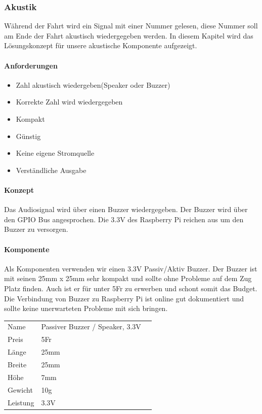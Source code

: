 \documentclass[../../main.tex]{subfiles}
\begin{document}
\subsubsection{Akustik}
Während der Fahrt wird ein Signal mit einer Nummer gelesen, diese Nummer soll am Ende der Fahrt akustisch wiedergegeben werden. In diesem Kapitel wird das Lösungskonzept für unsere akustische Komponente aufgezeigt.

\paragraph{Anforderungen}
\begin{itemize}
    \item Zahl akustisch wiedergeben(Speaker oder Buzzer)
    \item Korrekte Zahl wird wiedergegeben
    \item Kompakt
    \item Günstig
    \item Keine eigene Stromquelle
    \item Verständliche Ausgabe
\end{itemize}

\paragraph{Konzept}
Das Audiosignal wird über einen Buzzer wiedergegeben. Der Buzzer wird über den GPIO Bus angesprochen. Die 3.3V des Raspberry Pi reichen aus um den Buzzer zu versorgen.

\paragraph{Komponente}
Als Komponenten verwenden wir einen 3.3V Passiv/Aktiv Buzzer. Der Buzzer ist mit seinen 25mm x 25mm sehr kompakt und sollte ohne Probleme auf dem Zug Platz finden. Auch ist er für unter 5Fr zu erwerben und schont somit das Budget. Die Verbindung von Buzzer zu Raspberry Pi ist online gut dokumentiert und sollte keine unerwarteten Probleme mit sich bringen.

\begin{table}[] \centering
\begin{tabular}{lll}
Name & Passiver Buzzer / Speaker, 3.3V \\
Preis & 5Fr    \\
Länge & 25mm    \\
Breite & 25mm   \\
Höhe & 7mm      \\
Gewicht & 10g   \\
Leistung & 3.3V \\
\end{tabular}
\end{table}
\end{document}
